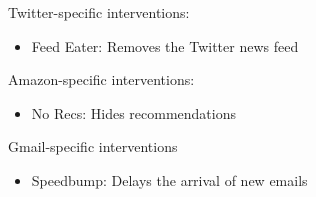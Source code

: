\vspace{2mm}

Twitter-specific interventions:

\begin{itemize}
    \item Feed Eater: Removes the Twitter news feed
\end{itemize}

\vspace{2mm}

Amazon-specific interventions:

\begin{itemize}
    \item No Recs: Hides recommendations
\end{itemize}

\vspace{2mm}

Gmail-specific interventions

\begin{itemize}
    \item Speedbump: Delays the arrival of new emails
\end{itemize}

\vspace{3mm}